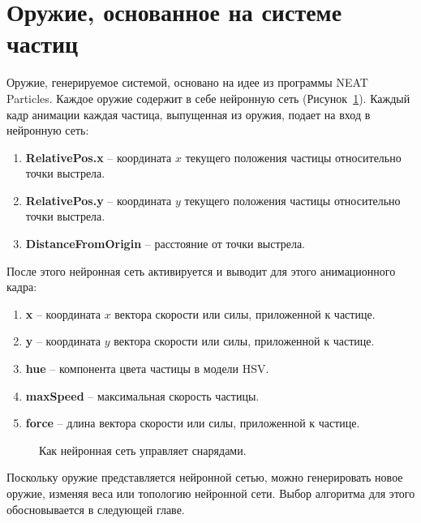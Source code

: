 ﻿%
\section{Оружие, основанное на системе частиц}\label{sec:WeaponIdea}

Оружие, генерируемое системой, основано на идее из программы NEAT Particles\cite{s2,s3}. Каждое оружие содержит в себе нейронную сеть (Рисунок~\ref{Weapon}). Каждый кадр анимации каждая частица, выпущенная из оружия, подает на вход в нейронную сеть:

\begin{enumerate}
    \item {\small \textbf{RelativePos.x}} -- координата $x$ текущего положения частицы относительно точки выстрела.
    \item {\small \textbf{RelativePos.y}} -- координата $y$ текущего положения частицы относительно точки выстрела.
    \item {\small \textbf{DistanceFromOrigin}} -- расстояние от точки выстрела.
\end{enumerate}

 После этого нейронная сеть активируется и выводит для этого анимационного кадра:

\begin{enumerate}
    \item {\small \textbf{x}} -- координата $x$ вектора скорости или силы, приложенной к частице.
    \item {\small \textbf{y}} -- координата $y$ вектора скорости или силы, приложенной к частице.
    \item {\small \textbf{hue}} -- компонента цвета частицы в модели HSV\@.
    \item {\small \textbf{maxSpeed}} -- максимальная скорость частицы.
    \item {\small \textbf{force}} -- длина вектора скорости или силы, приложенной к частице.
\end{enumerate}


\begin{figure}[ht]
    \begin{center}

        \caption{
            \label{Weapon}
            Как нейронная сеть управляет снарядами.}
    \end {center}
\end {figure}


Поскольку оружие представляется нейронной сетью, можно генерировать новое оружие, изменяя веса или топологию нейронной сети. Выбор алгоритма для этого обосновывается в следующей главе.
